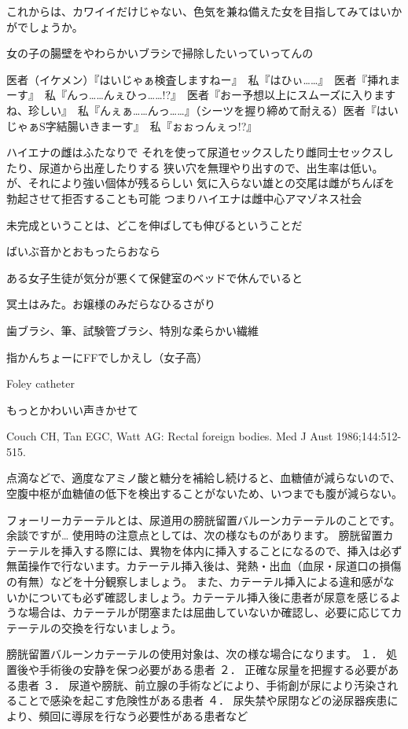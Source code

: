 これからは、カワイイだけじゃない、色気を兼ね備えた女を目指してみてはいかがでしょうか。



女の子の腸壁をやわらかいブラシで掃除したいっていってんの

医者（イケメン）『はいじゃぁ検査しますねー』　私『はひぃ……』　医者『挿れまーす』　私『んっ……んぇひっ……!?』　医者『おー予想以上にスムーズに入りますね、珍しい』　私『んぇぁ……んっ……』（シーツを握り締めて耐える）医者『はいじゃぁS字結腸いきまーす』　私『ぉぉっんぇっ!?』

ハイエナの雌はふたなりで
それを使って尿道セックスしたり雌同士セックスしたり、尿道から出産したりする
狭い穴を無理やり出すので、出生率は低い。が、それにより強い個体が残るらしい
気に入らない雄との交尾は雌がちんぽを勃起させて拒否することも可能
つまりハイエナは雌中心アマゾネス社会

未完成ということは、どこを伸ばしても伸びるということだ

ばいぶ音かとおもったらおなら

ある女子生徒が気分が悪くて保健室のベッドで休んでいると

冥土はみた。お嬢様のみだらなひるさがり


歯ブラシ、筆、試験管ブラシ、特別な柔らかい繊維


指かんちょーにFFでしかえし（女子高）

 Foley catheter



もっとかわいい声きかせて

Couch CH, Tan EGC, Watt AG: Rectal foreign bodies. Med J Aust 1986;144:512-515. 

点滴などで、適度なアミノ酸と糖分を補給し続けると、血糖値が減らないので、空腹中枢が血糖値の低下を検出することがないため、いつまでも腹が減らない。

フォーリーカテーテルとは、尿道用の膀胱留置バルーンカテーテルのことです。
余談ですが…
使用時の注意点としては、次の様なものがあります。
膀胱留置カテーテルを挿入する際には、異物を体内に挿入することになるので、挿入は必ず無菌操作で行ないます。カテーテル挿入後は、発熱・出血（血尿・尿道口の損傷の有無）などを十分観察しましょう。
また、カテーテル挿入による違和感がないかについても必ず確認しましょう。カテーテル挿入後に患者が尿意を感じるような場合は、カテーテルが閉塞または屈曲していないか確認し、必要に応じてカテーテルの交換を行ないましょう。

膀胱留置バルーンカテーテルの使用対象は、次の様な場合になります。
１． 処置後や手術後の安静を保つ必要がある患者
２． 正確な尿量を把握する必要がある患者
３． 尿道や膀胱、前立腺の手術などにより、手術創が尿により汚染されることで感染を起こす危険性がある患者
４． 尿失禁や尿閉などの泌尿器疾患により、頻回に導尿を行なう必要性がある患者など



